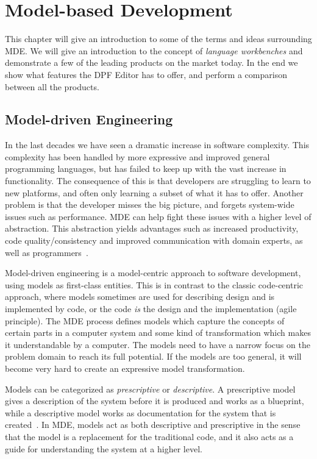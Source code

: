 \chapter{Model-based Development}\label{chap:model_based_development}
This chapter will give an introduction to some of the terms and ideas surrounding MDE. We will give an introduction to the concept of \emph{language workbenches} and demonstrate a few of the leading products on the market today. In the end we show what features the DPF Editor has to offer, and perform a comparison between all the products.

\section{Model-driven Engineering}
In the last decades we have seen a dramatic increase in software complexity. This complexity has been handled by more expressive and improved general programming languages, but has failed to keep up with the vast increase in functionality. The consequence of this is that developers are struggling to learn to new platforms, and often only learning a subset of what it has to offer. Another problem is that the developer misses the big picture, and forgets system-wide issues such as performance. MDE can help fight these issues with a higher level of abstraction. This abstraction yields advantages such as increased productivity, code quality/consistency and improved communication with domain experts, as well as programmers~\cite{rutle_thesis_2010}\cite{fowler2010domain}.

Model-driven engineering is a model-centric approach to software development, using models as first-class entities. This is in contrast to the classic code-centric approach, where models sometimes are used for describing design and is implemented by code, or the code \emph{is} the design and the implementation (agile principle). The MDE process defines models which capture the concepts of certain parts in a computer system and some kind of transformation which makes it understandable by a computer. The models need to have a narrow focus on the problem domain to reach its full potential. If the models are too general, it will become very hard to create an expressive model transformation. 

Models can be categorized as \emph{prescriptive} or \emph{descriptive}. A prescriptive model gives a description of the system before it is produced and works as a blueprint, while a descriptive model works as documentation for the system that is created~\cite{Gonzalez-Perez:2007:MSD:1290192.1290209}. In MDE, models act as both descriptive and prescriptive in the sense that the model is a replacement for the traditional code, and it also acts as a guide for understanding the system at a higher level.

